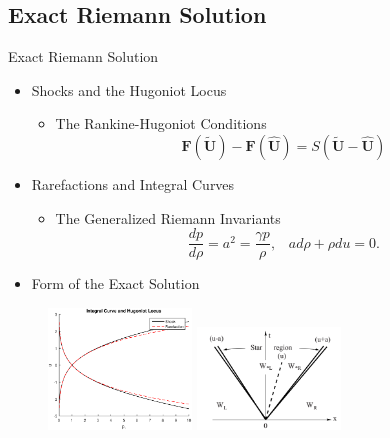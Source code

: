 \documentclass{beamer}
\newcommand{\mbf}{\mathbf}
\newcommand{\bq}{\begin{equation}}
\newcommand{\eq}{\end{equation}}
\begin{document}
\subsection{Exact Riemann Solution}
\begin{frame}{Exact Riemann Solution}
\begin{itemize}
\item Shocks and the Hugoniot Locus
\begin{itemize}
\item The Rankine-Hugoniot Conditions
\bq 
\mbf{F}(\tilde{\mbf{U}})-\mbf{F}(\hat{\mbf{U}})=S(\tilde{\mbf{U}}-\hat{\mbf{U}})
\eq
\end{itemize}

\item Rarefactions and Integral Curves
\begin{itemize}
\item The Generalized Riemann Invariants
\bq \frac{dp}{d\rho}=a^2=\frac{\gamma p}{\rho},\;\;\; ad\rho+\rho du=0.\eq
\end{itemize}

\item Form of the Exact Solution
\end{itemize}
\begin{figure}[f]
\includegraphics[width=1.5in]{hugoniot1}
\includegraphics[width=1.5in]{riemannsoln}
\end{figure}

\end{frame}
\end{document}
